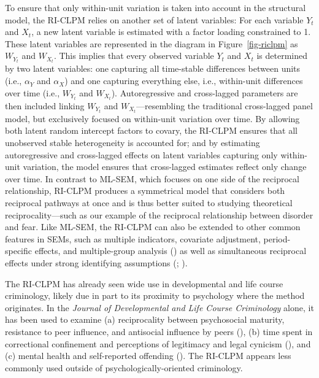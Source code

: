 \documentclass[
  letterpaper,
  DIV=11,
  numbers=noendperiod]{scrartcl}
\begin{document}
To ensure that only within-unit variation is taken into account in the
structural model, the RI-CLPM relies on another set of latent variables:
For each variable \(Y_t\) and \(X_t\), a new latent variable is
estimated with a factor loading constrained to 1. These latent variables
are represented in the diagram in Figure~\ref{fig-riclpm} as \(W_{Y_t}\)
and \(W_{X_t}\). This implies that every observed variable \(Y_t\) and
\(X_t\) is determined by two latent variables: one capturing all
time-stable differences between units (i.e., \(\alpha_Y\) and
\(\alpha_X\)) and one capturing everything else, i.e., within-unit
differences over time (i.e., \(W_{Y_t}\) and \(W_{X_t}\)).
Autoregressive and cross-lagged parameters are then included linking
\(W_{Y_t}\) and \(W_{X_t}\)---resembling the traditional cross-lagged
panel model, but exclusively focused on within-unit variation over time.
By allowing both latent random intercept factors to covary, the RI-CLPM
ensures that all unobserved stable heterogeneity is accounted for; and
by estimating autoregressive and cross-lagged effects on latent
variables capturing only within-unit variation, the model ensures that
cross-lagged estimates reflect only change over time. In contrast to
ML-SEM, which focuses on one side of the reciprocal relationship,
RI-CLPM produces a symmetrical model that considers both reciprocal
pathways at once and is thus better suited to studying theoretical
reciprocality---such as our example of the reciprocal relationship
between disorder and fear. Like ML-SEM, the RI-CLPM can also be extended
to other common features in SEMs, such as multiple indicators, covariate
adjustment, period-specific effects, and multiple-group analysis
() as well as
simultaneous reciprocal effects under strong identifying assumptions
(;
).

The RI-CLPM has already seen wide use in developmental and life course
criminology, likely due in part to its proximity to psychology where the
method originates. In the \emph{Journal of Developmental and Life Course
Criminology} alone, it has been used to examine (a) reciprocality
between psychosocial maturity, resistance to peer influence, and
antisocial influence by peers (), (b) time spent in correctional confinement and
perceptions of legitimacy and legal cynicism
(), and (c) mental health
and self-reported offending (). The RI-CLPM appears less commonly used outside of
psychologically-oriented criminology.
\end{document}
